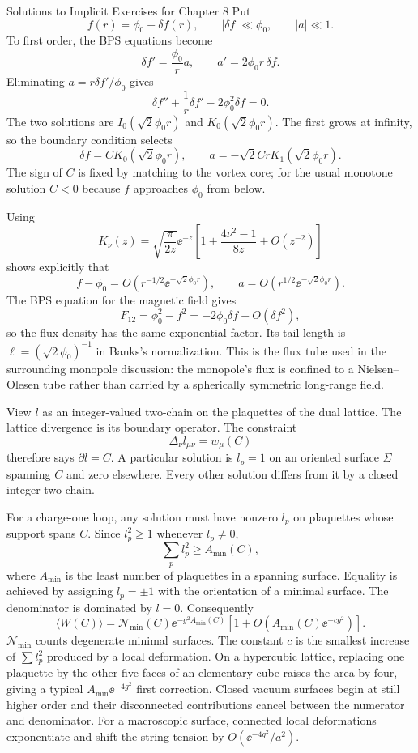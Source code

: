 \begin{bankssolutions}{Solutions to Implicit Exercises for Chapter 8}
Put
\[
 f(r)=\phi_0+\delta f(r),\qquad |\delta f|\ll\phi_0,
 \qquad |a|\ll1.
\]
To first order, the BPS equations become
\[
 \delta f'=\frac{\phi_0}{r}a,
 \qquad a'=2\phi_0 r\,\delta f. \tag{8.I.18}
\]
Eliminating $a=r\delta f'/\phi_0$ gives
\[
 \delta f''+\frac1r\delta f'-2\phi_0^2\delta f=0. \tag{8.I.19}
\]
The two solutions are $I_0(\sqrt2\phi_0r)$ and
$K_0(\sqrt2\phi_0r)$.  The first grows at infinity, so the boundary condition
selects
\[
 \delta f=C K_0(\sqrt2\phi_0r),
 \qquad
 a=-\sqrt2Cr K_1(\sqrt2\phi_0r). \tag{8.I.20}
\]
The sign of $C$ is fixed by matching to the vortex core; for the usual
monotone solution $C<0$ because $f$ approaches $\phi_0$ from below.

Using
\[
 K_\nu(z)=\sqrt{\frac{\pi}{2z}}\ee^{-z}
 \left[1+\frac{4\nu^2-1}{8z}+O(z^{-2})\right]
\]
shows explicitly that
\[
 f-\phi_0=O(r^{-1/2}\ee^{-\sqrt2\phi_0r}),
 \qquad a=O(r^{1/2}\ee^{-\sqrt2\phi_0r}).
\]
The BPS equation for the magnetic field gives
\[
 F_{12}=\phi_0^2-f^2=-2\phi_0\delta f+O(\delta f^2),
\]
so the flux density has the same exponential factor.  Its tail length is
$\ell=(\sqrt2\phi_0)^{-1}$ in Banks's normalization.  This is the flux tube
used in the surrounding monopole discussion: the monopole's flux is confined
to a Nielsen--Olesen tube rather than carried by a spherically symmetric
long-range field.

View $l$ as an integer-valued two-chain on the plaquettes of the dual lattice.
The lattice divergence is its boundary operator.  The constraint
\[
 \Delta_\nu l_{\mu\nu}=w_\mu(C)
\]
therefore says $\partial l=C$.  A particular solution is $l_p=1$ on an
oriented surface $\Sigma$ spanning $C$ and zero elsewhere.  Every other
solution differs from it by a closed integer two-chain.

For a charge-one loop, any solution must have nonzero $l_p$ on plaquettes
whose support spans $C$.  Since $l_p^2\ge1$ whenever $l_p\ne0$,
\[
 \sum_p l_p^2\ge A_{\min}(C), \tag{8.I.21}
\]
where $A_{\min}$ is the least number of plaquettes in a spanning surface.
Equality is achieved by assigning $l_p=\pm1$ with the orientation of a
minimal surface.  The denominator is dominated by $l=0$.  Consequently
\[
 \langle W(C)\rangle=\mathcal N_{\min}(C)
 \ee^{-g^2A_{\min}(C)}
 \left[1+O\!\left(A_{\min}(C)\ee^{-c g^2}\right)\right].
 \tag{8.I.22}
\]
$\mathcal N_{\min}$ counts degenerate minimal surfaces.  The constant $c$ is
the smallest increase of $\sum l_p^2$ produced by a local deformation.  On a
hypercubic lattice, replacing one plaquette by the other five faces of an
elementary cube raises the area by four, giving a typical
$A_{\min}\ee^{-4g^2}$ first correction.  Closed vacuum surfaces begin at
still higher order and their disconnected contributions cancel between the
numerator and denominator.  For a macroscopic surface, connected local
deformations exponentiate and shift the string tension by
$O(\ee^{-4g^2}/a^2)$.


\end{bankssolutions}
